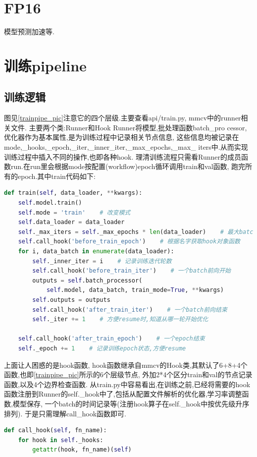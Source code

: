 \documentclass[UTF8]{ctexart}
\begin{document}
\section{FP16}
模型预测加速等.


\section{训练pipeline}
\label{trainpipeline}
\subsection{训练逻辑}
图见\ref{trainpipe_pic}注意它的四个层级.主要查看api/train.py, mmcv中的runner相关文件.
主要两个类:Runner和Hook
Runner将模型,批处理函数batch\_pro
cessor,优化器作为基本属性,是为训练过程中记录相关节点信息,
这些信息均被记录在mode,\_hooks,\_epoch,\_iter,\_inner\_iter,\_max\_epochs,\_max\_
iters中.从而实现训练过程中插入不同的操作,也即各种hook.
理清训练流程只需看Runner的成员函数run.在run里会根据mode按配置(workflow)epoch循环调用train和val函数,
跑完所有的epoch.其中train代码如下:
\lstset{style=mystyle}
\begin{lstlisting}[language=Python]
 def train(self, data_loader, **kwargs):
	self.model.train()
	self.mode = 'train'    # 改变模式
	self.data_loader = data_loader
	self._max_iters = self._max_epochs * len(data_loader)    # 最大batch循环次数
	self.call_hook('before_train_epoch')    # 根据名字获取hook对象函数
	for i, data_batch in enumerate(data_loader):
		self._inner_iter = i    # 记录训练迭代轮数
		self.call_hook('before_train_iter')    # 一个batch前向开始
		outputs = self.batch_processor(
			self.model, data_batch, train_mode=True, **kwargs)
		self.outputs = outputs
		self.call_hook('after_train_iter')    # 一个batch前向结束
		self._iter += 1    # 方便resume时,知道从哪一轮开始优化

	self.call_hook('after_train_epoch')    # 一个epoch结束
	self._epoch += 1    # 记录训练epoch状态,方便resume

\end{lstlisting}

上面让人困惑的是hook函数,
hook函数继承自mmcv的Hook类,其默认了6+8+4个函数,也即\ref{trainpipe_pic}所示的6个层级节点,
外加2*4个区分train和val的节点记录函数,以及4个边界检查函数.
从train.py中容易看出,在训练之前,已经将需要的hook函数注册到Runner的self.\_hook中了,包括从配置文件解析的优化器,学习率调整函数,模型保存,
一个batch的时间记录等(注册hook算子在self.\_hook中按优先级升序排列).
于是只需理解call\_hook函数即可.
\lstset{style=mystyle}
\begin{lstlisting}[language=Python]
def call_hook(self, fn_name):
	for hook in self._hooks:
		getattr(hook, fn_name)(self)
\end{lstlisting}
\end{document}
